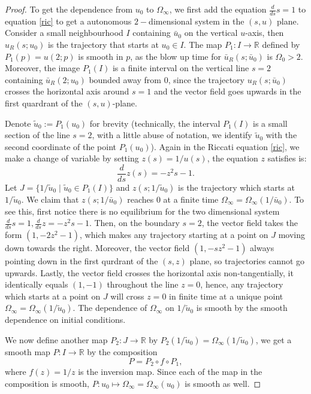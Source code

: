 \documentclass[letterpaper,11pt]{article}
\numberwithin{equation}{section}
\theoremstyle{plain}
\begin{document}
\begin{proof}To get the dependence from $u_0$ to $\Omega_\infty$, we first add the equation $\frac{d}{ds}s=1$ to equation \eqref{ric} to get a autonomous $2-$dimensional system in the $(s,u)$ plane. Consider a small neighbourhood $I$ containing $\bar{u}_0$ on the vertical $u$-axis, then $u_R(s; u_0)$ is the trajectory that starts at $u_0 \in I$. The map $P_1 : I \to \mathbb{R}$ defined by $P_1(p) = u(2; p)$ is smooth in $p$, as the blow up time for $\bar{u}_R(s;\bar{u}_0)$ is $\Omega_0 >2$. Moreover, the image $P_1(I)$ is a finite interval on the vertical line $s=2$ containing $\bar{u}_R(2;u_0)$ bounded away from $0$, since the trajectory $u_R(s;\bar{u}_0)$ crosses the horizontal axis around $s=1$ and the vector field goes upwards in the first quardrant of the $(s,u)$-plane.

Denote $\tilde{u}_0:= P_1(u_0)$ for brevity (technically, the interval $P_1(I)$ is a small section of the line $s=2$, with a little abuse of notation, we identify $\tilde{u}_0$ with the second coordinate of the point $P_1(u_0)$). Again in the Riccati equation \eqref{ric}, we make a change of variable by setting $z(s) = 1/u(s)$, the equation $z$ satisfies is:
\[
\frac{d}{ds}z(s) = -z^2s -1.
\]
Let $J = \{ 1/\tilde{u}_0 \mid  \tilde{u}_0 \in P_1(I)\}$ and $z(s; 1/\tilde{u}_0)$ is the trajectory which starts at $1/\tilde{u}_0$. We claim that $z(s; 1/\bar{u}_0)$ reaches $0$ at a finite time $\Omega_\infty = \Omega_\infty(1/\bar{u}_0)$. To see this, first notice there is no equilibrium for the two dimensional system $\frac{d}{ds}s=1, \frac{d}{ds}z=-z^2s-1$. Then, on the boundary $s=2$, the vector field takes the form $(1,-2z^2-1)$, which makes any trajectory starting at a point on $J$ moving down towards the right. Moreover, the vector field $(1,-sz^2-1)$ always pointing down in the first qurdrant of the $(s,z)$ plane, so trajectories cannot go upwards. Lastly, the vector field crosses the horizontal axis non-tangentially, it identically equals $(1,-1)$ throughout the line $z=0$, hence, any trajectory which starts at a point on $J$ will cross $z=0$ in finite time at a unique point $\Omega_\infty = \Omega_\infty(1/\tilde{u}_0)$. The dependence of $\Omega_\infty$ on $1/\tilde{u}_0$ is smooth by the smooth dependence on initial conditions.

 We now define another map $P_2 : J \to \mathbb{R}$ by $P_2(1/\tilde{u}_0) = \Omega_\infty(1/\tilde{u}_0)$, we get a smooth map $P: I \to \mathbb{R}$ by the composition
 \[
 P =P_2 \circ f \circ P_1,
 \] 
 where $f(z) = 1/z$ is the inversion map. Since each of the map in the composition is smooth, $P: u_0 \mapsto \Omega_\infty = \Omega_\infty(u_0)$ is smooth as well.


\end{proof}
\end{document}
